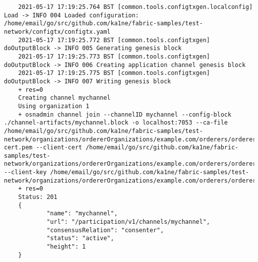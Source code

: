 \begin{lstlisting}
    2021-05-17 17:19:25.764 BST [common.tools.configtxgen.localconfig] Load -> INFO 004 Loaded configuration: /home/email/go/src/github.com/ka1ne/fabric-samples/test-network/configtx/configtx.yaml
    2021-05-17 17:19:25.772 BST [common.tools.configtxgen] doOutputBlock -> INFO 005 Generating genesis block
    2021-05-17 17:19:25.773 BST [common.tools.configtxgen] doOutputBlock -> INFO 006 Creating application channel genesis block
    2021-05-17 17:19:25.775 BST [common.tools.configtxgen] doOutputBlock -> INFO 007 Writing genesis block
    + res=0
    Creating channel mychannel
    Using organization 1
    + osnadmin channel join --channelID mychannel --config-block ./channel-artifacts/mychannel.block -o localhost:7053 --ca-file /home/email/go/src/github.com/ka1ne/fabric-samples/test-network/organizations/ordererOrganizations/example.com/orderers/orderer.example.com/msp/tlscacerts/tlsca.example.com-cert.pem --client-cert /home/email/go/src/github.com/ka1ne/fabric-samples/test-network/organizations/ordererOrganizations/example.com/orderers/orderer.example.com/tls/server.crt --client-key /home/email/go/src/github.com/ka1ne/fabric-samples/test-network/organizations/ordererOrganizations/example.com/orderers/orderer.example.com/tls/server.key
    + res=0
    Status: 201
    {
            "name": "mychannel",
            "url": "/participation/v1/channels/mychannel",
            "consensusRelation": "consenter",
            "status": "active",
            "height": 1
    }
    

\end{lstlisting}
